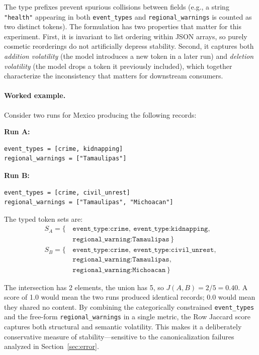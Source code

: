 \documentclass[sigconf]{acmart}
\begin{document}
The type prefixes prevent spurious collisions between fields (e.g., a string \texttt{"health"} appearing in both \texttt{event\_types} and \texttt{\texttt{regional\_\allowbreak warnings}} is counted as two distinct tokens). The formulation has two properties that matter for this experiment. First, it is invariant to list ordering within JSON arrays, so purely cosmetic reorderings do not artificially depress stability. Second, it captures both \emph{addition volatility} (the model introduces a new token in a later run) and \emph{deletion volatility} (the model drops a token it previously included), which together characterize the inconsistency that matters for downstream consumers.

\paragraph{Worked example.} Consider two runs for Mexico producing the following records:

\smallskip
\noindent\textbf{Run A:}
\begin{lstlisting}[basicstyle=\ttfamily\scriptsize, frame=none, backgroundcolor=\color{gray!5}]
event_types = [crime, kidnapping]
regional_warnings = ["Tamaulipas"]
\end{lstlisting}

\noindent\textbf{Run B:}
\begin{lstlisting}[basicstyle=\ttfamily\scriptsize, frame=none, backgroundcolor=\color{gray!5}]
event_types = [crime, civil_unrest]
regional_warnings = ["Tamaulipas", "Michoacan"]
\end{lstlisting}

\smallskip
\noindent The typed token sets are:
\begin{align*}
S_A = \{\,&\texttt{event\_type:crime},\ \texttt{event\_type:kidnapping},\\
         &\texttt{regional\_warning:Tamaulipas}\,\} \\[4pt]
S_B = \{\,&\texttt{event\_type:crime},\ \texttt{event\_type:civil\_unrest},\\
         &\texttt{regional\_warning:Tamaulipas},\\
         &\texttt{regional\_warning:Michoacan}\,\}
\end{align*}

The intersection has 2 elements, the union has 5, so $J(A, B) = 2/5 = 0.40$. A score of 1.0 would mean the two runs produced identical records; 0.0 would mean they shared no content.
By combining the categorically constrained \texttt{event\_types} and the free-form \texttt{regional\_warnings} in a single metric, the Row Jaccard score captures both structural and semantic volatility. This makes it a deliberately conservative measure of stability---sensitive to the canonicalization failures analyzed in Section~\ref{sec:error}.
\end{document}
